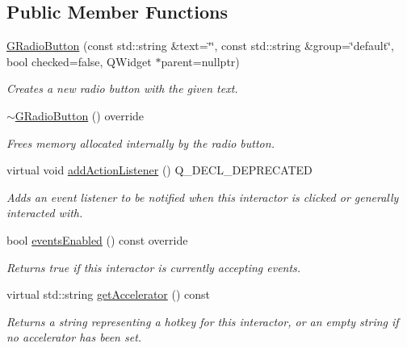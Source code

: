 \subsection*{Public Member Functions}
\begin{DoxyCompactItemize}
\item 
\mbox{\hyperlink{classsgl_1_1GRadioButton_ad9086510e97651d4dc528f115fd8aa6c}{G\+Radio\+Button}} (const std\+::string \&text=\char`\"{}\char`\"{}, const std\+::string \&group=\char`\"{}default\char`\"{}, bool checked=false, Q\+Widget $\ast$parent=nullptr)
\begin{DoxyCompactList}\small\item\em Creates a new radio button with the given text. \end{DoxyCompactList}\item 
\mbox{\hyperlink{classsgl_1_1GRadioButton_a424ac187807b9f40966b28b47b13121f}{$\sim$\+G\+Radio\+Button}} () override
\begin{DoxyCompactList}\small\item\em Frees memory allocated internally by the radio button. \end{DoxyCompactList}\item 
virtual void \mbox{\hyperlink{classsgl_1_1GInteractor_a02f20ea6edfa0671f31c4c648a253833}{add\+Action\+Listener}} () Q\+\_\+\+D\+E\+C\+L\+\_\+\+D\+E\+P\+R\+E\+C\+A\+T\+ED
\begin{DoxyCompactList}\small\item\em Adds an event listener to be notified when this interactor is clicked or generally interacted with. \end{DoxyCompactList}\item 
bool \mbox{\hyperlink{classsgl_1_1GInteractor_a597a370b592e3737d38d9d2f4e2031ea}{events\+Enabled}} () const override
\begin{DoxyCompactList}\small\item\em Returns true if this interactor is currently accepting events. \end{DoxyCompactList}\item 
virtual std\+::string \mbox{\hyperlink{classsgl_1_1GInteractor_a69f8d23ed8f207fbecad99960776e942}{get\+Accelerator}} () const
\begin{DoxyCompactList}\small\item\em Returns a string representing a hotkey for this interactor, or an empty string if no accelerator has been set. \end{DoxyCompactList}\item 

\end{DoxyCompactItemize}
